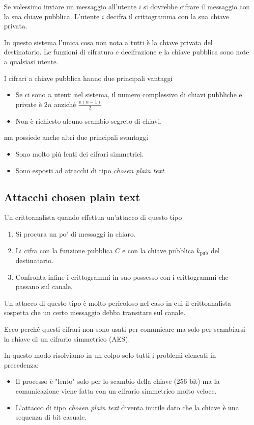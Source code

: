 Se volessimo inviare un messaggio all'utente $i$ si dovrebbe cifrare il messaggio con la sua chiave pubblica. L'utente $i$
decifra il crittogramma con la sua chiave privata.

In questo sistema l'unica cosa non nota a tutti \`e la chiave privata del destinatario. Le funzioni di cifratura e
decifrazione e la chiave pubblica sono note a qualsiasi utente.

I cifrari a chiave pubblica hanno due principali vantaggi
\begin{itemize}
	\item Se ci sono $n$ utenti nel sistema, il numero complessivo di chiavi pubbliche e private \`e $2n$ anzich\'e
	      $\frac{n(n-1)}{2}$
	\item Non \`e richiesto alcuno scambio segreto di chiavi.
\end{itemize}
ma possiede anche altri due principali svantaggi
\begin{itemize}
	\item Sono molto pi\`u lenti dei cifrari simmetrici.
	\item Sono esposti ad attacchi di tipo \emph{chosen plain text}.
\end{itemize}

\subsection{Attacchi chosen plain text}
Un crittoanalista quando effettua un'attacco di questo tipo
\begin{enumerate}
	\item Si procura un po' di messaggi in chiaro.
	\item Li cifra con la funzione pubblica $C$ e con la chiave pubblica $k_{\text{pub}}$ del destinatario.
	\item Confronta infine i crittogrammi in suo possesso con i crittogrammi che passano sul canale.
\end{enumerate}
Un attacco di questo tipo \`e molto pericoloso nel caso in cui il crittoanalista sospetta che un certo messaggio debba
transitare sul canale.

Ecco perch\'e questi cifrari non sono usati per comunicare ma solo per scambiarsi la chiave di un cifrario simmetrico
(AES).

In questo modo risolviamo in un colpo solo tutti i problemi elencati in precedenza:
\begin{itemize}
	\item Il processo \`e "lento" solo per lo scambio della chiave (256 bit) ma la comunicazione viene fatta con un
	      cifrario simmetrico molto veloce.
	\item L'attacco di tipo \emph{chosen plain text} diventa inutile dato che la chiave \`e una sequenza di bit casuale.
\end{itemize}

